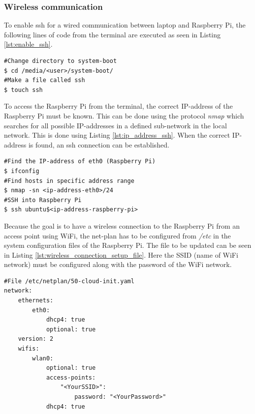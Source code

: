 \documentclass[../Head/report.tex]{subfiles}
\begin{document}
\subsubsection{Wireless communication}
To enable ssh for a wired communication between laptop and Raspberry Pi, the following lines of code from the terminal are executed as seen in Listing \ref{lst:enable_ssh}.      

\begin{lstlisting}[frame=none,caption={How to enable ssh communication by making a file called \textit{ssh} to system-boot of the sd card}, label=lst:enable_ssh]
#Change directory to system-boot
$ cd /media/<user>/system-boot/
#Make a file called ssh
$ touch ssh
\end{lstlisting}

To access the Raspberry Pi from the terminal, the correct IP-address of the Raspberry Pi must be known. This can be done using the protocol \textit{nmap} which searches for all possible IP-addresses in a defined sub-network in the local network. This is done using Listing \ref{lst:ip_address_ssh}. When the correct IP-address is found, an ssh connection can be established. 

\begin{lstlisting}[frame=none, caption={Find the IP-address of the Raspberry Pi for \textit{ssh} communication},label=lst:ip_address_ssh]
#Find the IP-address of eth0 (Raspberry Pi) 
$ ifconfig	
#Find hosts in specific address range 
$ nmap -sn <ip-address-eth0>/24
#SSH into Raspberry Pi 
$ ssh ubuntu$<ip-address-raspberry-pi>
\end{lstlisting}

Because the goal is to have a wireless connection to the Raspberry Pi from an access point using WiFi, the net-plan has to be configured from \textit{/etc}  in the system configuration files of the Raspberry Pi. The file to be updated can be seen in Listing \ref{lst:wireless_connection_setup_file}. Here the SSID (name of WiFi network) must be configured along with the password of the WiFi network. 

\begin{lstlisting}[frame=none, caption={File to configure to enable wireless connection},label=lst:wireless_connection_setup_file]
#File /etc/netplan/50-cloud-init.yaml
network:
    ethernets:
        eth0:
            dhcp4: true
            optional: true
    version: 2
    wifis:
        wlan0:
            optional: true
            access-points:
                "<YourSSID>":
                    password: "<YourPassword>"
            dhcp4: true

\end{lstlisting}
\end{document}
